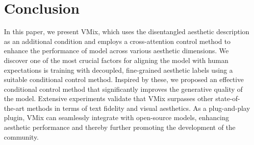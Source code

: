 \section{Conclusion}
\label{sec:Conclusion}
\label{sec:conclusion}
In this paper, we present VMix, which uses the disentangled aesthetic description as an additional condition and employs a cross-attention control method to enhance the performance of model across various aesthetic dimensions. We discover one of the most crucial factors for aligning the model with human expectations is training with decoupled, fine-grained aesthetic labels using a suitable conditional control method. Inspired by these, we proposed an effective conditional control method that significantly improves the generative quality of the model. Extensive experiments validate that VMix surpasses other state-of-the-art methods in terms of text fidelity and visual aesthetics. As a plug-and-play plugin, VMix can seamlessly integrate with open-source models, enhancing aesthetic performance and thereby further promoting the development of the community.